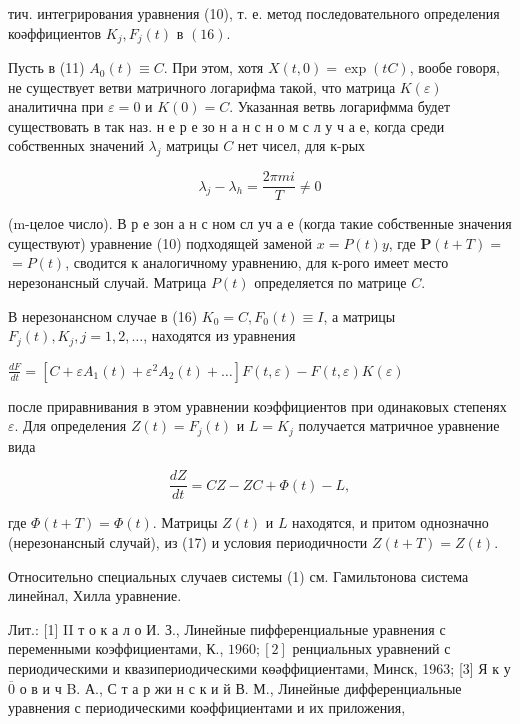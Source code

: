 \documentclass[10pt]{article}
\begin{document}
тич. интегрирования уравнения (10), т. е. метод последовательного определения коәффициентов $K_{j}, F_{j}(t)$ в $(16)$.



Пусть в (11) $A_{0}(t) \equiv C$. При этом, хотя $X(t, 0)=\exp (t C)$, вообе говоря, не существует ветви матричного логарифма такой, что матрица $K(\varepsilon)$ аналитична при $\varepsilon=0$ и $K(0)=C$. Указанная ветвь логарифмма будет существовать в так наз. н е р е зо н а н с н о м с л у ч а е, когда среди собственных значений $\lambda_{j}$ матрицы $C$ нет чисел, для к-рых



\[

\lambda_{j}-\lambda_{h}=\frac{2 \pi m i}{T} \neq 0

\]



(m-целое число). В р е зон а н с ном сл уч а е (когда такие собственные значения существуют) уравнение (10) подходящей заменой $x=P(t) y$, где $\boldsymbol{P}(t+T)=$ $=P(t)$, сводится к аналогичному уравнению, для к-рого имеет место нерезонансный случай. Матрица $P(t)$ определяется по матрице $C$.



В нерезонансном случае в (16) $K_{0}=C, F_{0}(t) \equiv I$, а матрицы $F_{j}(t), K_{j}, j=1,2, \ldots$, находятся из уравнения



$\frac{d F}{d t}=\left[C+\varepsilon A_{1}(t)+\varepsilon^{2} A_{2}(t)+\ldots\right] F(t, \varepsilon)-F(t, \varepsilon) K(\varepsilon)$



после приравнивания в этом уравнении коэффициентов при одинаковых степенях $\varepsilon$. Для определения $Z(t)=F_{j}(t)$ и $L=K_{j}$ получается матричное уравнение вида



\[

\frac{d Z}{d t}=C Z-Z C+\Phi(t)-L,

\]



где $\Phi(t+T)=\Phi(t)$. Матрицы $Z(t)$ и $L$ находятся, и притом однозначно (нерезонансный случай), из (17) и условия периодичности $Z(t+T)=Z(t)$.



Относительно специальных случаев системы (1) см. Гамильтонова система линейнал, Хилла уравнение.



Лит.: [1] II т о к а л о И. З., Линейные пифференциальные уравнения с переменными коэффициентами, К., $1960 ;[2]$ ренциальных уравнений с периодическими и квазипериодическими көәффициентами, Минск, 1963; [3] Я к у $\overline{0}$ о в и ч B. А., С т а р жи н с к и й В. М., Линейные дифференциальные уравнения с периодическими коәффициентами и их приложения,
\end{document}
